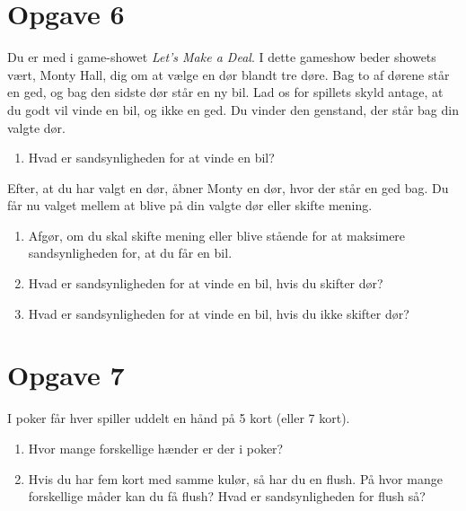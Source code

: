 \section*{Opgave 6}
Du er med i game-showet \textit{Let's Make a Deal}. I dette gameshow beder showets vært, Monty Hall, dig om at vælge en dør blandt tre døre. Bag to af dørene står en ged, og bag den sidste dør står en ny bil. Lad os for spillets skyld antage, at du godt vil vinde en bil, og ikke en ged. Du vinder den genstand, der står bag din valgte dør. 
\begin{enumerate}[label=\roman*)]
\item Hvad er sandsynligheden for at vinde en bil?
\end{enumerate}
Efter, at du har valgt en dør, åbner Monty en dør, hvor der står en ged bag. Du får nu valget mellem at blive på din valgte dør eller skifte mening.
\begin{enumerate}[label=\roman*)]
\item Afgør, om du skal skifte mening eller blive stående for at maksimere sandsynligheden for, at du får en bil.
\item Hvad er sandsynligheden for at vinde en bil, hvis du skifter dør?
\item Hvad er sandsynligheden for at vinde en bil, hvis du ikke skifter dør?
\end{enumerate}
\section*{Opgave 7}
I poker får hver spiller uddelt en hånd på 5 kort (eller 7 kort). 
\begin{enumerate}[label=\roman*)]
\item Hvor mange forskellige hænder er der i poker?
\item Hvis du har fem kort med samme kulør, så har du en flush. På hvor mange forskellige måder kan du få flush? Hvad er sandsynligheden for flush så?
\end{enumerate}